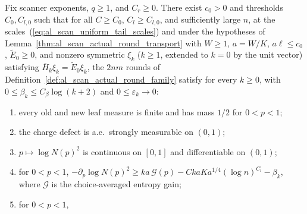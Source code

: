 \begin{lemma}
    \label{thm:al_scan_actual_transport_inputs}
    \leanok
    Fix scanner exponents, $q\ge1$, and $C_r\ge0$. There exist $c_0>0$ and
    thresholds $C_0,C_{l,0}$ such that for all $C\ge C_0$, $C_l\ge C_{l,0}$, and
    sufficiently large $n$, at the scales~(\ref{eq:al_scan_uniform_tail_scales})
    and under the hypotheses of Lemma~\ref{thm:al_scan_actual_round_transport}
    with $W\ge1$, $a=W/K$, $a\ell\le c_0$, $\widetilde E_0\ge0$, and nonzero
    symmetric $\xi_k$ ($k\ge1$, extended to $k=0$ by the unit vector) satisfying
    $\overline H_k\xi_k=\widetilde E_0\xi_k$, the $2nm$ rounds of
    Definition~\ref{def:al_scan_actual_round_family} satisfy for every $k\ge0$,
    with $0\le\beta_k\le C_\beta\log(k+2)$ and $0\le\varepsilon_k\to0$:
    \begin{enumerate}
        \item every old and new leaf measure is finite and has mass $1/2$ for
              $0<p<1$;
        \item the charge defect is a.e.\ strongly measurable on $(0,1)$;
        \item $p\mapsto\log N(p)^2$ is continuous on $[0,1]$ and differentiable
              on $(0,1)$;
        \item for $0<p<1$,
              $-\partial_p\log N(p)^2\ge ka\,\mathcal G(p)
                  -CkaKa^{1/4}(\log n)^{C_l}-\beta_k$,
              where $\mathcal G$ is the choice-averaged entropy gain;
        \item for $0<p<1$,

\end{enumerate}
\end{lemma}

